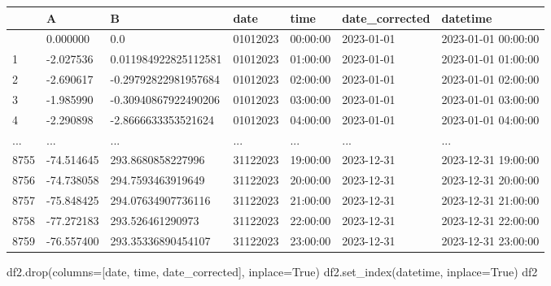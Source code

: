 \documentclass[
  letterpaper,
  DIV=11,
  numbers=noendperiod,
  oneside]{scrreprt}
\newenvironment{Shaded}{\begin{snugshade}}{\end{snugshade}}
\newcommand{\NormalTok}[1]{\textcolor[rgb]{0.00,0.23,0.31}{#1}}
\newcommand{\OperatorTok}[1]{\textcolor[rgb]{0.37,0.37,0.37}{#1}}
\newcommand{\StringTok}[1]{\textcolor[rgb]{0.13,0.47,0.30}{#1}}
\newcommand{\VariableTok}[1]{\textcolor[rgb]{0.07,0.07,0.07}{#1}}
\begin{document}
\begin{longtable}[]{@{}lllllll@{}}
\toprule\noalign{}
& A & B & date & time & date\_corrected & datetime \\
\midrule\noalign{}
\endhead
\bottomrule\noalign{}
\endlastfoot
0 & 0.000000 & 0.0 & 01012023 & 00:00:00 & 2023-01-01 & 2023-01-01
00:00:00 \\
1 & -2.027536 & 0.011984922825112581 & 01012023 & 01:00:00 & 2023-01-01
& 2023-01-01 01:00:00 \\
2 & -2.690617 & -0.29792822981957684 & 01012023 & 02:00:00 & 2023-01-01
& 2023-01-01 02:00:00 \\
3 & -1.985990 & -0.30940867922490206 & 01012023 & 03:00:00 & 2023-01-01
& 2023-01-01 03:00:00 \\
4 & -2.290898 & -2.8666633353521624 & 01012023 & 04:00:00 & 2023-01-01 &
2023-01-01 04:00:00 \\
... & ... & ... & ... & ... & ... & ... \\
8755 & -74.514645 & 293.8680858227996 & 31122023 & 19:00:00 & 2023-12-31
& 2023-12-31 19:00:00 \\
8756 & -74.738058 & 294.7593463919649 & 31122023 & 20:00:00 & 2023-12-31
& 2023-12-31 20:00:00 \\
8757 & -75.848425 & 294.07634907736116 & 31122023 & 21:00:00 &
2023-12-31 & 2023-12-31 21:00:00 \\
8758 & -77.272183 & 293.526461290973 & 31122023 & 22:00:00 & 2023-12-31
& 2023-12-31 22:00:00 \\
8759 & -76.557400 & 293.35336890454107 & 31122023 & 23:00:00 &
2023-12-31 & 2023-12-31 23:00:00 \\
\end{longtable}

\begin{Shaded}
\begin{Highlighting}[]
\NormalTok{df2.drop(columns}\OperatorTok{=}\NormalTok{[}\StringTok{\textquotesingle{}date\textquotesingle{}}\NormalTok{, }\StringTok{\textquotesingle{}time\textquotesingle{}}\NormalTok{, }\StringTok{\textquotesingle{}date\_corrected\textquotesingle{}}\NormalTok{], inplace}\OperatorTok{=}\VariableTok{True}\NormalTok{)}
\NormalTok{df2.set\_index(}\StringTok{\textquotesingle{}datetime\textquotesingle{}}\NormalTok{, inplace}\OperatorTok{=}\VariableTok{True}\NormalTok{)}
\NormalTok{df2}
\end{Highlighting}
\end{Shaded}
\end{document}
